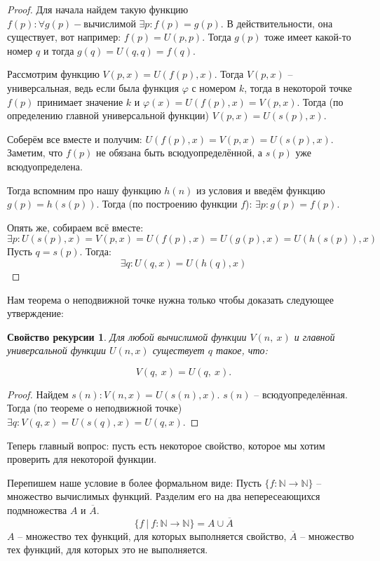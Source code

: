 \documentclass[a4paper, 12pt]{article}
\newtheorem*{rec}{Свойство рекурсии}
\newcommand{\N}{\mathbb{N}}
\begin{document}
\begin{proof}
    Для начала найдем такую функцию $f(p): \forall g(p) - \text{вычислимой } 
    \exists p: f(p) = g(p)$. В действительности, она существует, вот например:
    $f(p) = U(p, p)$. Тогда $g(p)$ тоже имеет какой-то номер $q$ и тогда
    $g(q) = U(q, q) = f(q)$.

    Рассмотрим функцию $V(p, x) = U(f(p), x)$. Тогда $V(p, x)$ -- универсальная,
    ведь если была функция $\varphi$ с номером $k$, тогда в некоторой точке $f(p)$
    принимает значение $k$ и $\varphi(x) = U(f(p), x) = V(p, x)$. 
    Тогда (по определению главной универсальной функции) $V(p, x) = U(s(p), x)$.

    Соберём все вместе и получим: $U(f(p), x) = V(p, x) = U(s(p), x)$. Заметим,
    что $f(p)$ не обязана быть всюдуопределённой, а $s(p)$ уже всюдуопределена.

    Тогда вспомним про нашу функцию $h(n)$ из условия и введём функцию $g(p) = h(s(p))$.
    Тогда (по построению функции $f$): $\exists p : g(p) = f(p)$.

    Опять же, собираем всё вместе:
    \[
    \exists p : U(s(p), x) = V(p, x) = U(f(p), x) = U(g(p), x) = U(h(s(p)), x)
    \]
    Пусть $q = s(p)$. Тогда:
    \[
    \exists q : U(q, x) = U(h(q), x)
    \]
\end{proof}

Нам теорема о неподвижной точке нужна только чтобы доказать следующее утверждение:

\begin{rec}
    Для любой вычислимой функции $V(n,\ x)$ и главной универсальной
    функции $U(n, x)$ существует $q$ такое, что:

    \[
        V(q,\ x) = U(q,\ x).
    \]

\end{rec}

\begin{proof}
    Найдем $s(n): V(n, x) = U(s(n), x)$. $s(n)$ -- всюдуопределённая.
    Тогда (по теореме о неподвижной точке)
    $\exists q : V(q, x) = U(s(q), x) = U(q, x)$.
\end{proof}

Теперь главный вопрос: пусть есть некоторое свойство, которое мы хотим проверить
для некоторой функции. 

Перепишем наше условие в более формальном виде:
Пусть $\{f:\N\to\N\}$ -- множество вычислимых функций. 
Разделим его на два непересеающихся подмножества $A$ и $\overline{A}$.
\[
\{f\ |\ f:\N\to\N\} = A \cup \overline{A}
\]
$A$ -- множество тех функций, для которых выполняется свойство,
$\overline{A}$ -- множество тех функций, для которых это не выполняется.
\end{document}
